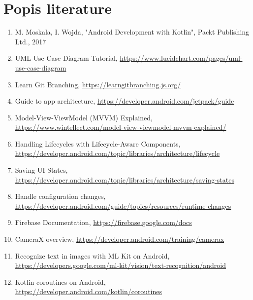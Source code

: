 \chapter*{Popis literature}
		
		\begin{enumerate}
			
			\item  M. Moskala, I. Wojda, "Android Development with Kotlin", Packt Publishing Ltd., 2017

			\item  UML Use Case Diagram Tutorial, \url{https://www.lucidchart.com/pages/uml-use-case-diagram}
			
			\item  Learn Git Branching, \url{https://learngitbranching.js.org/}
	
			\item  Guide to app architecture, \url{https://developer.android.com/jetpack/guide}

			\item  Model-View-ViewModel (MVVM) Explained, \url{https://www.wintellect.com/model-view-viewmodel-mvvm-explained/}

			\item  Handling Lifecycles with Lifecycle-Aware Components, \url{https://developer.android.com/topic/libraries/architecture/lifecycle}

			\item  Saving UI States, \url{https://developer.android.com/topic/libraries/architecture/saving-states}

			\item  Handle configuration changes, \url{https://developer.android.com/guide/topics/resources/runtime-changes}

			\item  Firebase Documentation, \url{https://firebase.google.com/docs}

			\item  CameraX overview, \url{https://developer.android.com/training/camerax}

			\item  Recognize text in images with ML Kit on Android, \url{https://developers.google.com/ml-kit/vision/text-recognition/android}

			\item  Kotlin coroutines on Android, \url{https://developer.android.com/kotlin/coroutines}

		\end{enumerate}
		
		 